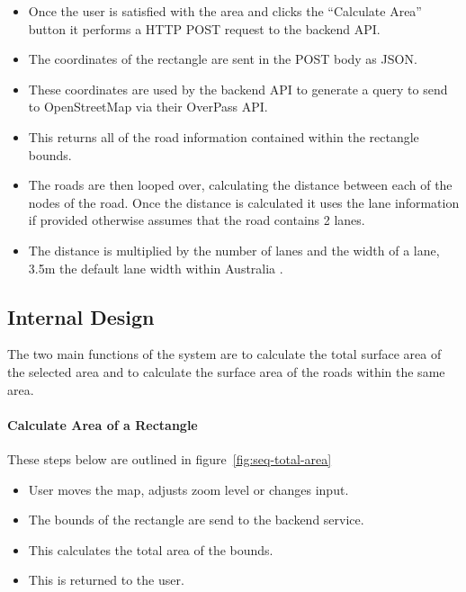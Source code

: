 \documentclass[a4paper,11pt]{article}
\begin{document}
\begin{itemize}
  \item Once the user is satisfied with the area and clicks the ``Calculate
    Area'' button it performs a HTTP POST request to the backend API.\@
  \item The coordinates of the rectangle are sent in the POST body as JSON.\@
  \item These coordinates are used by the backend API to generate a query to
    send to OpenStreetMap via their OverPass API.\@
  \item This returns all of the road information contained within the rectangle
    bounds.
  \item The roads are then looped over, calculating the distance between each of
    the nodes of the road. Once the distance is calculated it uses the lane
    information if provided otherwise assumes that the road contains 2 lanes.
  \item The distance is multiplied by the number of lanes and the width of a
    lane, 3.5m the default lane width within Australia \autocite{lane:11}.
\end{itemize}

\subsection{Internal Design}

The two main functions of the system are to calculate the total surface area
of the selected area and to calculate the surface area of the roads within the
same area.

\paragraph{Calculate Area of a Rectangle}

These steps below are outlined in figure~\ref{fig:seq-total-area}

\begin{itemize}
  \item User moves the map, adjusts zoom level or changes input.
  \item The bounds of the rectangle are send to the backend service.
  \item This calculates the total area of the bounds.
  \item This is returned to the user.
\end{itemize}
\end{document}
